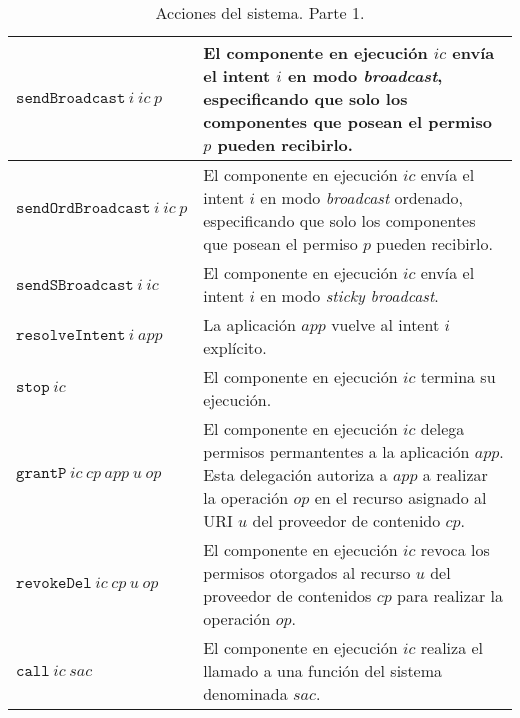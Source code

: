 \begin{table}
\begin{tabularx}{\linewidth}{|l X|}
        \hline
        $\mathtt{sendBroadcast}~i~ic~p$    & El componente en ejecución $ic$ envía el intent $i$ en modo \textit{broadcast}, especificando que solo los componentes que posean el permiso $p$ pueden recibirlo.                                                   \\
        \hline
        $\mathtt{sendOrdBroadcast}~i~ic~p$ & El componente en ejecución $ic$ envía el intent $i$ en modo \textit{broadcast} ordenado,  especificando que solo los componentes que posean el permiso $p$ pueden recibirlo.                                         \\
        \hline
        $\mathtt{sendSBroadcast}~i~ic$     & El componente en ejecución $ic$ envía el intent $i$ en modo \textit{sticky broadcast}.                                                                                                                               \\
        \hline
        $\mathtt{resolveIntent}~i~app$     & La aplicación $app$ vuelve al intent $i$ explícito.                                                                                                                                                                  \\
        \hline
        $\mathtt{stop}~ic$                 & El componente en ejecución $ic$ termina su ejecución.                                                                                                                                                                \\
        \hline
        $\mathtt{grantP}~ic~cp~app~u~op$   & El componente en ejecución $ic$ delega permisos permantentes a la aplicación $app$. Esta delegación autoriza a $app$ a realizar la operación $op$ en el recurso asignado al URI $u$ del proveedor de contenido $cp$. \\
        \hline
        $\mathtt{revokeDel}~ic~cp~u~op$    & El componente en ejecución $ic$ revoca los permisos otorgados al recurso $u$ del proveedor de contenidos $cp$ para realizar la operación $op$.                                                                       \\
        \hline
        $\mathtt{call}~ic~sac$             & El componente en ejecución $ic$ realiza el llamado a una función del sistema denominada $sac$.                                                                                                                       \\
        \hline
    \end{tabularx}
    \caption{Acciones del sistema. Parte 1.}
\end{table}

